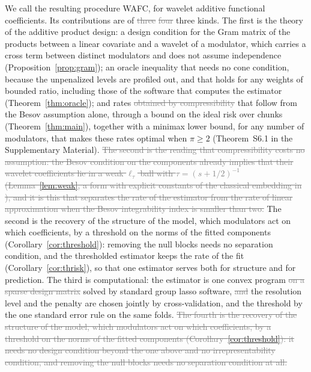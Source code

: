 \documentclass[12pt]{article} %
\theoremstyle{definition}
\theoremstyle{plain}
\begin{document}
We call the resulting procedure WAFC, for wavelet additive functional
coefficients. Its contributions are of \textcolor{gray}{\sout{three}} \textcolor{gray}{\sout{four}} \textcolor{colR1}{three} kinds. The first is the theory of
the additive product design: a design condition for the Gram matrix of the
products between a linear covariate and a wavelet of a modulator, which
carries a cross term between distinct modulators and does not assume
independence (Proposition~\ref{prop:gram}); an oracle inequality that needs no
cone condition, because the unpenalized levels are profiled out\textcolor{colR1}{, and
that holds for any weights of bounded ratio, including those of the software
that computes the estimator}
(Theorem~\ref{thm:oracle}); and rates \textcolor{gray}{\sout{obtained by compressibility}}
\textcolor{colR1}{that follow from the Besov assumption alone, through a bound on the
ideal risk over chunks}
(Theorem~\ref{thm:main})\textcolor{colR1}{, together with a minimax lower bound, for any number
of modulators, that makes these rates optimal when $\pi \ge 2$ (Theorem~S6.1 in
the Supplementary Material)}. \textcolor{gray}{\sout{The second is the reading that compressibility costs
no assumption: the Besov condition on the components already implies that
their wavelet coefficients lie in a weak $\ell_\tau$ ball with
$\tau = (s+1/2)^{-1}$ (Lemma~\mbox{\ref{lem:weak}}, a form with explicit constants
of the classical embedding in \mbox{\citealp[Proposition~9.15]{johnstone2019gaussian}}),
and it is this that separates the rate of the estimator from the rate of linear
approximation when the Besov integrability index is smaller than two.}}
\textcolor{colR1}{The second is the recovery of the structure of the model, which
modulators act on which coefficients, by a threshold on the norms of the
fitted components (Corollary~\ref{cor:threshold}): removing the null blocks
needs no separation condition, and the thresholded estimator keeps the rate of
the fit (Corollary~\ref{cor:thrisk}), so that one estimator serves both for
structure and for prediction.} The third is computational: the
estimator is one convex program \textcolor{gray}{\sout{on a sparse design matrix}} \textcolor{colR1}{solved by
standard group lasso software}, \textcolor{gray}{\sout{and}} the resolution
level and the penalty are chosen jointly \textcolor{colR1}{by cross-validation, and the
threshold by the one standard error rule on the same folds}.
\textcolor{gray}{\sout{The fourth is the recovery of the structure of the model, which
modulators act on which coefficients, by a threshold on the norms of the
fitted components (Corollary~\mbox{\ref{cor:threshold}}): it needs no design
condition beyond the one above and no irrepresentability condition, and
removing the null blocks needs no separation condition at all.}}
\end{document}
